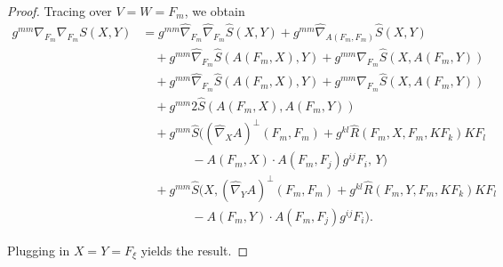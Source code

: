 \documentclass[12pt,letterpaper]{amsart}%
\numberwithin{mycounter}{section}
\theoremstyle{plain}
\numberwithin{equation}{section}
\theoremstyle{definition}
\newcommand{\maxidx}{\mathord{\xi}} %
\begin{document}
\begin{proof}
Tracing over $V=W=F_{m}$, we obtain
\begin{align*}
g^{mm}\nabla_{F_{m}}\nabla_{F_{m}}S(X,Y) &  =g^{mm}\hat{\nabla}_{F_{m}}%
\hat{\nabla}_{F_{m}}\hat{S}(X,Y)+g^{mm}\hat{\nabla}_{A(F_{m},F_{m})}\hat
{S}(X,Y)\\
&  \quad+g^{mm}\hat{\nabla}_{F_{m}}\hat{S}(A(F_{m},X),Y)+g^{mm}\hat{\nabla
}_{F_{m}}\hat{S}(X,A(F_{m},Y))\\
&  \quad+g^{mm}\hat{\nabla}_{F_{m}}\hat{S}(A(F_{m},X),Y)+g^{mm}\hat{\nabla
}_{F_{m}}\hat{S}(X,A(F_{m},Y))\\
&  \quad+g^{mm}2\hat{S}(A(F_{m},X),A(F_{m},Y))\\
&  \quad+g^{mm}\hat{S}\!\Big(\left(  \hat{\nabla}_{X}A\right)  ^{\perp}%
(F_{m},F_{m})+g^{kl}\hat{R}(F_{m},X,F_{m},KF_{k})KF_{l}\\
&  \qquad\qquad-A(F_{m},X)\cdot A(F_{m},F_{j})g^{ij}F_{i},\,Y\Big)\\
&  \quad+g^{mm}\hat{S}\!\Big(X,\left(  \hat{\nabla}_{Y}A\right)  ^{\perp
}(F_{m},F_{m})+g^{kl}\hat{R}(F_{m},Y,F_{m},KF_{k})KF_{l}\\
&  \qquad\qquad-A(F_{m},Y)\cdot A(F_{m},F_{j})g^{ij}F_{i}\Big).
\end{align*}


Plugging in $X=Y=F_{\maxidx}$ yields the result.

\end{proof}
\end{document}

